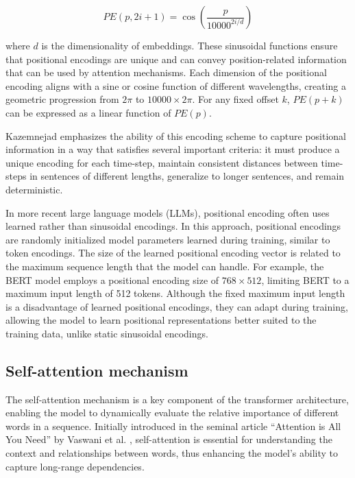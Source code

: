 \begin{equation}
    PE(p, 2i + 1) = \cos\left(\frac{p}{10000^{2i/d}}\right)
\end{equation}

where \( d \) is the dimensionality of embeddings. These sinusoidal functions ensure that positional encodings are unique and can convey position-related information that can be used by attention mechanisms. Each dimension of the positional encoding aligns with a sine or cosine function of different wavelengths, creating a geometric progression from \( 2\pi \) to \( 10000 \times 2\pi \). For any fixed offset \( k \), \( PE(p+k) \) can be expressed as a linear function of \( PE(p) \).

Kazemnejad \cite{kazemnejad2019:pencoding} emphasizes the ability of this encoding scheme to capture positional information in a way that satisfies several important criteria: it must produce a unique encoding for each time-step, maintain consistent distances between time-steps in sentences of different lengths, generalize to longer sentences, and remain deterministic.

In more recent large language models (LLMs), positional encoding often uses learned rather than sinusoidal encodings. In this approach, positional encodings are randomly initialized model parameters learned during training, similar to token encodings. The size of the learned positional encoding vector is related to the maximum sequence length that the model can handle. For example, the BERT model \cite{devlin2018bert} employs a positional encoding size of \( 768 \times 512 \), limiting BERT to a maximum input length of 512 tokens. Although the fixed maximum input length is a disadvantage of learned positional encodings, they can adapt during training, allowing the model to learn positional representations better suited to the training data, unlike static sinusoidal encodings.

\subsection{Self-attention mechanism}

The self-attention mechanism is a key component of the transformer architecture, enabling the model to dynamically evaluate the relative importance of different words in a sequence. Initially introduced in the seminal article “Attention is All You Need” by Vaswani et al. \cite{vaswani2017attention}, self-attention is essential for understanding the context and relationships between words, thus enhancing the model's ability to capture long-range dependencies.

